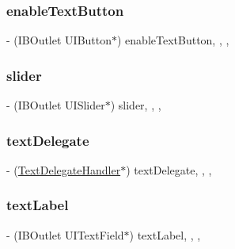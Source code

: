 \subsubsection{\texorpdfstring{enable\+Text\+Button}{enableTextButton}}
{\footnotesize\ttfamily -\/ (I\+B\+Outlet U\+I\+Button$\ast$) enable\+Text\+Button\hspace{0.3cm}{\ttfamily [read]}, {\ttfamily [write]}, {\ttfamily [nonatomic]}, {\ttfamily [weak]}}

\hypertarget{interface_picture_editor_view_afc10700e0347203367f6ca5aaaa143a3}{}\label{interface_picture_editor_view_afc10700e0347203367f6ca5aaaa143a3} 
\subsubsection{\texorpdfstring{slider}{slider}}
{\footnotesize\ttfamily -\/ (I\+B\+Outlet U\+I\+Slider$\ast$) slider\hspace{0.3cm}{\ttfamily [read]}, {\ttfamily [write]}, {\ttfamily [nonatomic]}, {\ttfamily [weak]}}

\hypertarget{interface_picture_editor_view_a61a2d1aa02618d35a3eb7c26e794f638}{}\label{interface_picture_editor_view_a61a2d1aa02618d35a3eb7c26e794f638} 
\subsubsection{\texorpdfstring{text\+Delegate}{textDelegate}}
{\footnotesize\ttfamily -\/ (\hyperlink{interface_text_delegate_handler}{Text\+Delegate\+Handler}$\ast$) text\+Delegate\hspace{0.3cm}{\ttfamily [read]}, {\ttfamily [write]}, {\ttfamily [nonatomic]}, {\ttfamily [strong]}}

\hypertarget{interface_picture_editor_view_a51584f852efd8bc284ffa96a617dfd0a}{}\label{interface_picture_editor_view_a51584f852efd8bc284ffa96a617dfd0a} 
\subsubsection{\texorpdfstring{text\+Label}{textLabel}}
{\footnotesize\ttfamily -\/ (I\+B\+Outlet U\+I\+Text\+Field$\ast$) text\+Label\hspace{0.3cm}{\ttfamily [read]}, {\ttfamily [write]}, {\ttfamily [nonatomic]}, {\ttfamily [weak]}}

